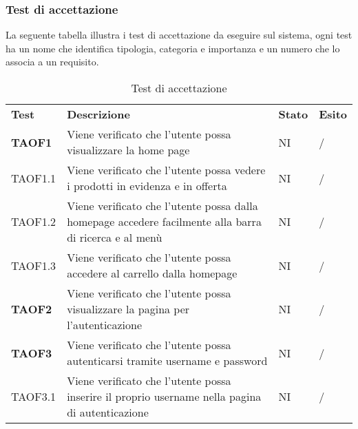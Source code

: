 \subsubsection{Test di accettazione}
La seguente tabella illustra i test di accettazione da eseguire sul sistema, ogni test ha un nome che identifica tipologia, categoria e importanza e un numero che lo associa a un requisito.
\begin{center}
    \centering
    \renewcommand{\arraystretch}{1.8}
    \label{tab:TestAccettazione}
    \begin{longtable}[!h]{p{60px} p{240px} p{35px} p{35px}}
        \caption{Test di accettazione}                                                                                                                          \\
        \rowcolor{logo!70}
        \textbf{Test}   & \textbf{Descrizione}                                                                                & \textbf{Stato} & \textbf{Esito} \\
\textbf{TAOF1}  & Viene verificato che l'utente possa visualizzare la home page                                                       & NI              & /              \\
        TAOF1.1         & Viene verificato che l'utente possa vedere i prodotti in evidenza e in offerta                                      & NI              & /              \\
        TAOF1.2         & Viene verificato che l'utente possa dalla homepage accedere facilmente alla barra di ricerca e al menù             & NI              & /              \\
        TAOF1.3         & Viene verificato che l'utente possa accedere al carrello dalla homepage                                            & NI              & /              \\
        \textbf{TAOF2}  & Viene verificato che l'utente possa visualizzare la pagina per l'autenticazione                                     & NI              & /              \\
        \textbf{TAOF3}  & Viene verificato che l'utente possa autenticarsi tramite username e password                                        & NI              & /              \\
        TAOF3.1         & Viene verificato che l'utente possa inserire il proprio username nella pagina di autenticazione                     & NI              & /              \\

\end{longtable}
\end{center}
